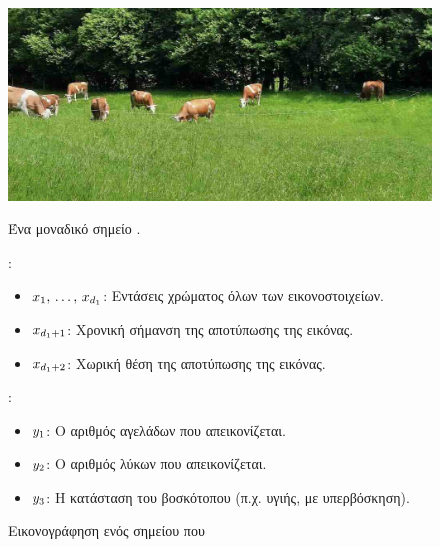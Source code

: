 {{\begin{figure}[H]
    			\begin{minipage}[t]{0.95\textwidth}
	        		\centering
	        		\includegraphics[width=\textwidth]{assets/CowsAustria.jpg}
	        		\caption*{\foreignlanguage{greek}{Ένα μοναδικό σημείο} .}
	        		\vspace{5mm}
    			\end{minipage}
    			\begin{minipage}[t]{0.95\textwidth}
	        		:
	        		\begin{itemize}
            			\item $x_{1}, \,\ldots, \,x_{d_{1}}$: \foreignlanguage{greek}{Εντάσεις χρώματος όλων των εικονοστοιχείων.}
           			\item $x_{d_{1}+1}$: \foreignlanguage{greek}{Χρονική σήμανση της αποτύπωσης της εικόνας.} 
            			\item $x_{d_{1}+2}$: \foreignlanguage{greek}{Χωρική θέση της αποτύπωσης της εικόνας.} 
			\end{itemize}
			:
            		\begin{itemize}
	               	 	\item $y_{1}$: \foreignlanguage{greek}{Ο αριθμός αγελάδων που απεικονίζεται.} 
	                		\item $y_{2}$: \foreignlanguage{greek}{Ο αριθμός λύκων που απεικονίζεται.} 
	                		\item $y_{3}$: \foreignlanguage{greek}{Η κατάσταση του βοσκότοπου (π.χ. υγιής, με υπερβόσκηση).}
            		\end{itemize}
    			\end{minipage}
			{
    			\caption{\foreignlanguage{greek}{Εικονογράφηση ενός σημείου}  \foreignlanguage{greek}{που 
}}}
\end{figure}}}
